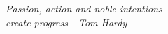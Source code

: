\hfill
\begin{minipage}[t]{0.47\textwidth}\raggedleft
    \vspace{55mm}
    {{\large}{\emph{Passion, action and noble intentions\\
          create progress - Tom Hardy}}{\normalsize\vspace{3mm}}}
\end{minipage}
